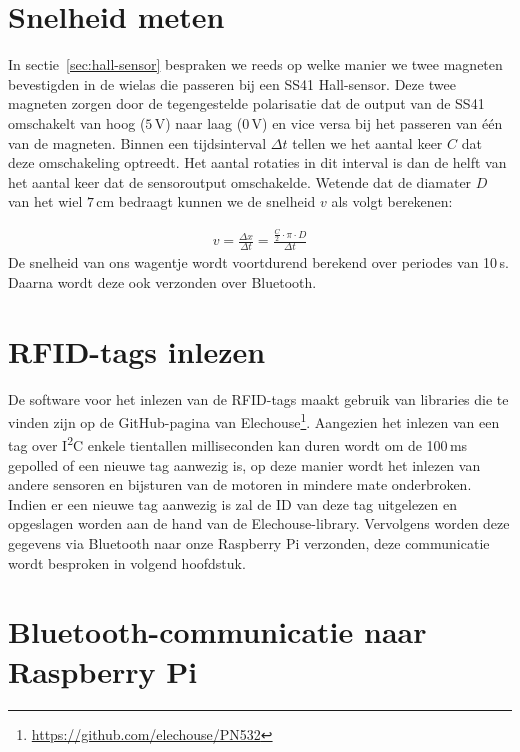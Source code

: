 \section{Snelheid meten}
In sectie~\vref{sec:hall-sensor} bespraken we reeds op welke manier we twee magneten bevestigden in de wielas die passeren bij een SS41 Hall-sensor.
Deze twee magneten zorgen door de tegengestelde polarisatie dat de output van de SS41 omschakelt van hoog ($5\,\mathrm{V}$) naar laag ($0\,\mathrm{V}$) en vice versa bij het passeren van \'e\'en van de magneten. 
Binnen een tijdsinterval $\Delta t$ tellen we het aantal keer $C$ dat deze omschakeling optreedt. Het aantal rotaties in dit interval is dan de helft van het aantal keer dat de sensoroutput omschakelde. Wetende dat de diamater $D$ van het wiel $7\,\mathrm{cm}$ bedraagt kunnen we de snelheid $v$ als volgt berekenen:

\begin{gather*}
v=\frac{\Delta x}{\Delta t} = \frac{\frac{C}{2}\cdot\pi\cdot D}{\Delta t}
\end{gather*}
De snelheid van ons wagentje wordt voortdurend berekend over periodes van 10\,s. Daarna wordt deze ook verzonden over Bluetooth.

\section{RFID-tags inlezen}
De software voor het inlezen van de RFID-tags maakt gebruik van libraries die te vinden zijn op de GitHub-pagina van Elechouse\footnote{\url{https://github.com/elechouse/PN532}}. Aangezien het inlezen van een tag over I\textsuperscript{2}C enkele tientallen milliseconden kan duren wordt om de 100\,ms gepolled of een nieuwe tag aanwezig is, op deze manier wordt het inlezen van andere sensoren en bijsturen van de motoren in mindere mate onderbroken. Indien er een nieuwe tag aanwezig is zal de ID van deze tag uitgelezen en opgeslagen worden aan de hand van de Elechouse-library. Vervolgens worden deze gegevens via Bluetooth naar onze Raspberry Pi verzonden, deze communicatie wordt besproken in volgend hoofdstuk.

\section{Bluetooth-communicatie naar Raspberry Pi}\label{sec:bluetooth-communicatie-naar-raspberry-pi}
